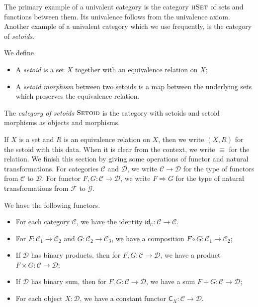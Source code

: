 \documentclass[9pt]{entcs}
\newcommand{\type}[1]{\textsc{#1}}
\newcommand{\category}[1]{\textsc{#1}}
\newcommand{\functortxt}[1]{\mathsf{#1}}
\newcommand{\hset}{\type{hSet}} %
\newcommand{\0}{\textbf{0}} %
\newcommand{\1}{\textbf{1}} %
\newcommand{\setoids}{\category{Setoid}} %
\newcommand{\functor}[2]{#1 \longrightarrow #2} %
\newcommand{\idf}[1]{\functortxt{id}_{#1}} %
\newcommand{\Cf}[1]{\functortxt{C}_{#1}} %
\newcommand{\compf}[2]{#1 \circ #2} %
\newcommand{\prodf}[2]{#1 \times #2} %
\newcommand{\sumf}[2]{#1 + #2} %
\newcommand{\nattrans}[2]{#1 \Longrightarrow #2} %
\begin{document}
The primary example of a univalent category is the category $\hset$ of sets and functions between them.
Its univalence follows from the univalence axiom.
Another example of a univalent category which we use frequently, is the category of \emph{setoids}.

\begin{definition}
\label{def:setoid}
We define
\begin{itemize}
	\item A \emph{setoid} is a set $X$ together with an equivalence relation on $X$;
	\item A \emph{setoid morphism} between two setoids  is a map between the underlying sets which preserves the equivalence relation.
\end{itemize}
The \emph{category of setoids} $\setoids$ is the category with setoids and setoid morphisms as objects and morphisms.
\end{definition}

If $X$ is a set and $R$ is an equivalence relation on $X$, then we write $(X, R)$ for the setoid with this data.
When it is clear from the context, we write $\equiv$ for the relation.
We finish this section by giving some operations of functor and natural transformations.
For categories $\mathcal{C}$ and $\mathcal{D}$, we write $\functor{\mathcal{C}}{\mathcal{D}}$ for the type of functors from $\mathcal{C}$ to $\mathcal{D}$.
For functor $F, G : \functor{\mathcal{C}}{\mathcal{D}}$, we write $\nattrans{F}{G}$ for the type of natural transformations from $\mathcal{F}$ to $\mathcal{G}$.

\begin{lemma}
\label{def:functor}
We have the following functors.
\begin{itemize}
	\item For each category $\mathcal{C}$, we have the identity $\idf{\mathcal{C}} : \functor{\mathcal{C}}{\mathcal{C}}$.
	\item For $F : \functor{\mathcal{C}_1}{\mathcal{C}_2}$ and $G : \functor{\mathcal{C}_2}{\mathcal{C}_3}$, we have a composition $\compf{F}{G} : \functor{\mathcal{C}_1}{\mathcal{C}_2}$;
	\item If $\mathcal{D}$ has binary products, then for $F, G : \functor{\mathcal{C}}{\mathcal{D}}$, we have a product $\prodf{F}{G} : \functor{\mathcal{C}}{\mathcal{D}}$;
	\item If $\mathcal{D}$ has binary sum, then for $F, G : \functor{\mathcal{C}}{\mathcal{D}}$, we have a sum $\sumf{F}{G} : \functor{\mathcal{C}}{\mathcal{D}}$;
	\item For each object $X : \mathcal{D}$, we have a constant functor $\Cf{X} : \functor{\mathcal{C}}{\mathcal{D}}$.
\end{itemize}
\end{lemma}
\end{document}
